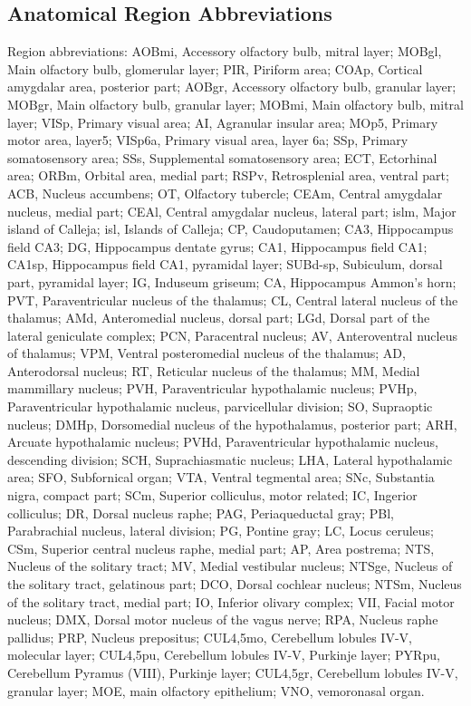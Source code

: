 \subsection{Anatomical Region Abbreviations}
Region abbreviations: AOBmi, Accessory olfactory bulb, mitral layer; MOBgl, Main olfactory bulb, glomerular layer; PIR, Piriform area; COAp, Cortical amygdalar area, posterior part; AOBgr, Accessory olfactory bulb, granular layer; MOBgr, Main olfactory bulb, granular layer; MOBmi, Main olfactory bulb, mitral layer; VISp, Primary visual area; AI, Agranular insular area; MOp5, Primary motor area, layer5; VISp6a, Primary visual area, layer 6a; SSp, Primary somatosensory area; SSs, Supplemental somatosensory area; ECT, Ectorhinal area; ORBm, Orbital area, medial part; RSPv, Retrosplenial area, ventral part; ACB, Nucleus accumbens; OT, Olfactory tubercle; CEAm, Central amygdalar nucleus, medial part; CEAl, Central amygdalar nucleus, lateral part; islm, Major island of Calleja; isl, Islands of Calleja; CP, Caudoputamen; CA3, Hippocampus field CA3; DG, Hippocampus dentate gyrus; CA1, Hippocampus field CA1; CA1sp, Hippocampus field CA1, pyramidal layer; SUBd-sp, Subiculum, dorsal part, pyramidal layer; IG, Induseum griseum; CA, Hippocampus Ammon’s horn; PVT, Paraventricular nucleus of the thalamus; CL, Central lateral nucleus of the thalamus; AMd, Anteromedial nucleus, dorsal part; LGd, Dorsal part of the lateral geniculate complex; PCN, Paracentral nucleus; AV, Anteroventral nucleus of thalamus; VPM, Ventral posteromedial nucleus of the thalamus; AD, Anterodorsal nucleus; RT, Reticular nucleus of the thalamus; MM, Medial mammillary nucleus; PVH, Paraventricular hypothalamic nucleus; PVHp, Paraventricular hypothalamic nucleus, parvicellular division; SO, Supraoptic nucleus; DMHp, Dorsomedial nucleus of the hypothalamus, posterior part; ARH, Arcuate hypothalamic nucleus; PVHd, Paraventricular hypothalamic nucleus, descending division; SCH, Suprachiasmatic nucleus; LHA, Lateral hypothalamic area; SFO, Subfornical organ; VTA, Ventral tegmental area; SNc, Substantia nigra, compact part; SCm, Superior colliculus, motor related; IC, Ingerior colliculus; DR, Dorsal nucleus raphe; PAG, Periaqueductal gray; PBl, Parabrachial nucleus, lateral division; PG, Pontine gray; LC, Locus ceruleus; CSm, Superior central nucleus raphe, medial part; AP, Area postrema; NTS, Nucleus of the solitary tract; MV, Medial vestibular nucleus; NTSge, Nucleus of the solitary tract, gelatinous part; DCO, Dorsal cochlear nucleus; NTSm, Nucleus of the solitary tract, medial part; IO, Inferior olivary complex; VII, Facial motor nucleus; DMX, Dorsal motor nucleus of the vagus nerve; RPA, Nucleus raphe pallidus; PRP, Nucleus prepositus; CUL4,5mo, Cerebellum lobules IV-V, molecular layer; CUL4,5pu, Cerebellum lobules IV-V, Purkinje layer; PYRpu, Cerebellum Pyramus (VIII), Purkinje layer; CUL4,5gr, Cerebellum lobules IV-V, granular layer; MOE, main olfactory epithelium; VNO, vemoronasal organ.



